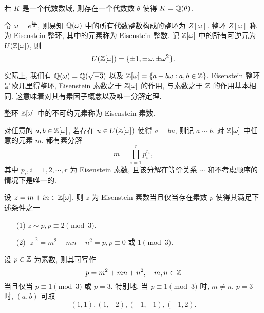 \begin{theorem}
若 $K$ 是一个代数数域, 则存在一个代数数 $\theta$ 使得 $K=\mathbb{Q}(\theta) $.
\end{theorem}

\begin{definition}
    令 $\omega =e^{\frac{2\pi i}{3}}$, 则易知 $\mathbb{Q} (\omega)$ 中的所有代数整数构成的整环为 $Z[\omega]$. 整环 $Z[\omega]$ 称为 Eisenstein 整环, 其中的元素称为 Eisenstein 整数. 记 $\mathbb{Z} [\omega]$ 中的所有可逆元为 $U(\mathbb{Z}[\omega])$, 则
    \begin{equation*}
        U(\mathbb{Z}[\omega])=\lbrace\pm 1,\pm \omega, \pm \omega ^2\rbrace.
    \end{equation*}
\end{definition}
实际上, 我们有 $\mathbb{Q}(\omega)=\mathbb{Q}(\sqrt{-3})$ 以及 $\mathbb{Z}[\omega]=\lbrace a+b\omega:a,b\in \mathbb{Z} \rbrace.$
Eisenstein 整环是欧几里得整环, Eisenstein 素数之于 $\mathbb{Z}[\omega]$ 的作用, 与素数之于 $\mathbb{Z}$ 的作用基本相同. 这意味着对其有素因子概念以及唯一分解定理. 
\begin{definition}
    整环 $\mathbb{Z}[\omega]$ 中的不可约元素称为 Eisenstein 素数.
\end{definition}
\begin{theorem}
    对任意的 $a,b\in \mathbb{Z}[\omega]$, 若存在 $u\in U(\mathbb{Z}[\omega])$ 使得 $a=bu$, 则记 $a\sim b$. 对 $\mathbb{Z} [\omega]$ 中任意的元素 $m$, 都有素分解
    \begin{equation*}
        m=\prod_{i=1}^r p_i^{r_i}, 
    \end{equation*}
    其中 $p_i,i=1,2,\cdots, r$ 为 Eisenstein 素数, 且该分解在等价关系 $\sim$ 和不考虑顺序的情况下是唯一的.
\end{theorem}

\begin{theorem}\label{thm-eisenstein}
    设 $z=m+in\in \mathbb{Z}[\omega]$, 则 $z$ 为 Eisenstein 素数当且仅当存在素数 $p$ 使得其满足下述条件之一
    \begin{enumerate}
        \item[\rm{(1)}] $z\sim p, p\equiv 2\pmod{3}$.
        \item[\rm{(2)}] $|z|^2=m^2-mn+n^2=p, p\equiv 0 \text{ 或 } 1\pmod{3}$.
    \end{enumerate}
\end{theorem}

\begin{corollary}
    设 $p\in \mathbb{Z}$ 为素数, 则其可写作
    \begin{equation*}
        p=m^2+mn+n^2,\quad m,n\in \mathbb{Z}
    \end{equation*}
    当且仅当 $p\equiv 1\pmod{3}$ 或 $p=3$. 特别地, 当 $p\equiv 1 \pmod{3}$ 时, $m\neq n$, $p=3$ 时, $(a,b)$ 可取
    \begin{equation*}
        (1,1),(1,-2),(-1,-1),(-1,2).
    \end{equation*}
\end{corollary}
    
